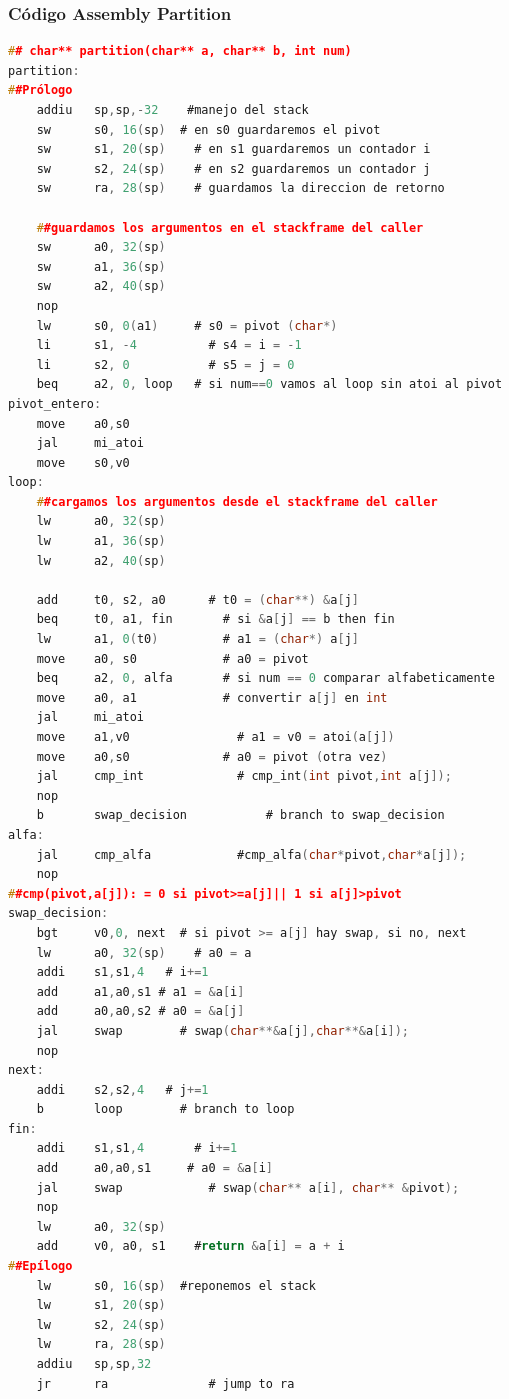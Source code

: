 \documentclass[a4paper,10pt]{article}
\numberwithin{equation}{section}
\numberwithin{figure}{section}
\begin{document}
\subsubsection{Código Assembly Partition}
\begin{lstlisting}[language=c, numbers=none]
## char** partition(char** a, char** b, int num)
partition:
##Prólogo
    addiu   sp,sp,-32    #manejo del stack
    sw		s0, 16(sp)	# en s0 guardaremos el pivot	
    sw      s1, 20(sp)    # en s1 guardaremos un contador i
    sw      s2, 24(sp)    # en s2 guardaremos un contador j
    sw      ra, 28(sp)    # guardamos la direccion de retorno
    
    ##guardamos los argumentos en el stackframe del caller
    sw      a0, 32(sp)    
    sw      a1, 36(sp)
    sw      a2, 40(sp)
    nop
    lw      s0, 0(a1)     # s0 = pivot (char*)
    li		s1, -4		    # s4 = i = -1 
    li		s2, 0		    # s5 = j = 0
    beq     a2, 0, loop   # si num==0 vamos al loop sin atoi al pivot
pivot_entero:
    move    a0,s0
    jal     mi_atoi
    move    s0,v0
loop:
    ##cargamos los argumentos desde el stackframe del caller
    lw      a0, 32(sp)        
    lw      a1, 36(sp)
    lw      a2, 40(sp)
    
    add		t0, s2, a0		# t0 = (char**) &a[j]
    beq     t0, a1, fin       # si &a[j] == b then fin
    lw      a1, 0(t0)         # a1 = (char*) a[j]
    move    a0, s0            # a0 = pivot
    beq     a2, 0, alfa       # si num == 0 comparar alfabeticamente
    move    a0, a1            # convertir a[j] en int
    jal     mi_atoi
    move 	a1,v0		        # a1 = v0 = atoi(a[j])
    move    a0,s0             # a0 = pivot (otra vez)
    jal		cmp_int             # cmp_int(int pivot,int a[j]);
    nop
    b		swap_decision			# branch to swap_decision
alfa:
    jal     cmp_alfa            #cmp_alfa(char*pivot,char*a[j]);
    nop
##cmp(pivot,a[j]): = 0 si pivot>=a[j]|| 1 si a[j]>pivot
swap_decision:
    bgt		v0,0, next	# si pivot >= a[j] hay swap, si no, next
    lw      a0, 32(sp)    # a0 = a
    addi    s1,s1,4   # i+=1
    add     a1,a0,s1 # a1 = &a[i]
    add     a0,a0,s2 # a0 = &a[j]
    jal     swap        # swap(char**&a[j],char**&a[i]);
    nop
next:
    addi    s2,s2,4   # j+=1
    b		loop		# branch to loop
fin:
    addi    s1,s1,4       # i+=1
    add     a0,a0,s1     # a0 = &a[i]
    jal     swap            # swap(char** a[i], char** &pivot);
    nop
    lw      a0, 32(sp)
    add     v0, a0, s1    #return &a[i] = a + i
##Epílogo
    lw		s0, 16(sp)	#reponemos el stack 
    lw      s1, 20(sp)
    lw      s2, 24(sp)
    lw      ra, 28(sp)
    addiu   sp,sp,32
    jr		ra				# jump to ra
\end{lstlisting}
\end{document}
